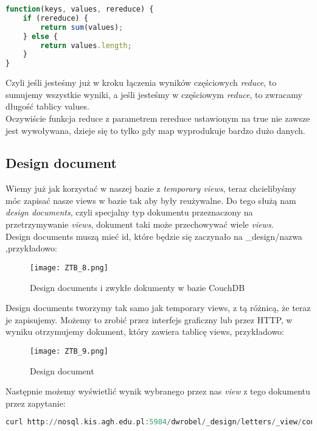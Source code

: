 \documentclass[a4paper,15pt]{article}
\begin{document}
\begin{lstlisting}[language=JavaScript]
function(keys, values, rereduce) {
	if (rereduce) {
		return sum(values);
	} else {
		return values.length;
	}
}
\end{lstlisting}
Czyli jeśli jesteśmy już w kroku łączenia wyników częściowych \textit{reduce}, to sumujemy wszystkie wyniki, a jeśli jesteśmy w częściowym \textit{reduce}, to zwracamy długość tablicy values. \\

Oczywiście funkcja reduce z parametrem rereduce ustawionym na true nie zawsze jest wywoływana, dzieje się to tylko gdy map wyprodukuje bardzo dużo danych. 


\subsection{Design document}

Wiemy już jak korzystać w naszej bazie z \textit{temporary views}, teraz chcielibyśmy móc zapisać nasze views w bazie tak aby były reużywalne. Do tego służą nam \textit{design documents}, czyli specjalny typ dokumentu przeznaczony na przetrzymywanie \textit{views}, dokument taki może przechowywać wiele \textit{views}. \\

Design documents muszą mieć id, które będzie się zaczynało na \_design/nazwa ,przykładowo:

\begin{figure}[H]
\centering
  \texttt{[image: ZTB\_8.png]}
  \caption{Design documents i zwykłe dokumenty w bazie CouchDB}
\end{figure}

Design documents tworzymy tak samo jak temporary views, z tą różnicą, że teraz je zapisujemy. Możemy to zrobić przez interfejs graficzny lub przez HTTP, w wyniku otrzymujemy dokument, który zawiera tablicę views, przykładowo:

\begin{figure}[H]
\centering
  \texttt{[image: ZTB\_9.png]}
  \caption{Design document}
\end{figure}

Następnie możemy wyświetlić wynik wybranego przez nas \textit{view} z tego dokumentu przez zapytanie:

\begin{lstlisting}[language=Ada, caption=Testowanie design documents]
curl http://nosql.kis.agh.edu.pl:5984/dwrobel/_design/letters/_view/countLetters
\end{lstlisting}
\end{document}
